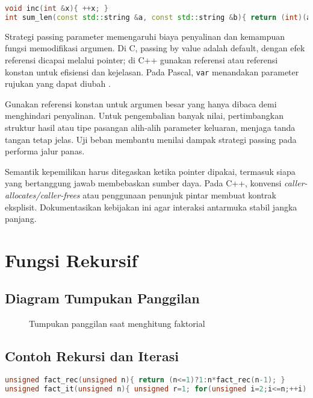 \documentclass[../main.tex]{subfiles}
\begin{document}
\begin{lstlisting}[language=C++, caption={Referensi dan referensi konstan (C++)}]
void inc(int &x){ ++x; }
int sum_len(const std::string &a, const std::string &b){ return (int)(a.size()+b.size()); }
\end{lstlisting}
Strategi passing parameter memengaruhi biaya penyalinan dan kemampuan fungsi memodifikasi argumen. Di C, passing by value adalah default, dengan efek referensi dicapai melalui pointer; di C++ gunakan referensi atau referensi konstan untuk efisiensi dan kejelasan. Pada Pascal, \texttt{var} menandakan parameter rujukan yang dapat diubah \parencite{gnu-c-manual,free-pascal-docs}.

Gunakan referensi konstan untuk argumen besar yang hanya dibaca demi menghindari penyalinan. Untuk pengembalian banyak nilai, pertimbangkan struktur hasil atau tipe pasangan alih-alih parameter keluaran, menjaga tanda tangan tetap jelas. Uji beban membantu menilai dampak strategi passing pada performa jalur panas.

Semantik kepemilikan harus ditegaskan ketika pointer dipakai, termasuk siapa yang bertanggung jawab membebaskan sumber daya. Pada C++, konvensi \emph{caller-allocates/caller-frees} atau penggunaan penunjuk pintar membuat kontrak eksplisit. Dokumentasikan kebijakan ini agar interaksi antarmuka stabil jangka panjang.

\section{Fungsi Rekursif}
\subsection{Diagram Tumpukan Panggilan}
\begin{figure}[h]
  \centering
  \caption{Tumpukan panggilan saat menghitung faktorial}
\end{figure}

\subsection{Contoh Rekursi dan Iterasi}
\begin{lstlisting}[language=C, caption={Faktorial rekursif dan iteratif (C)}]
unsigned fact_rec(unsigned n){ return (n<=1)?1:n*fact_rec(n-1); }
unsigned fact_it(unsigned n){ unsigned r=1; for(unsigned i=2;i<=n;++i) r*=i; return r; }
\end{lstlisting}
\end{document}
